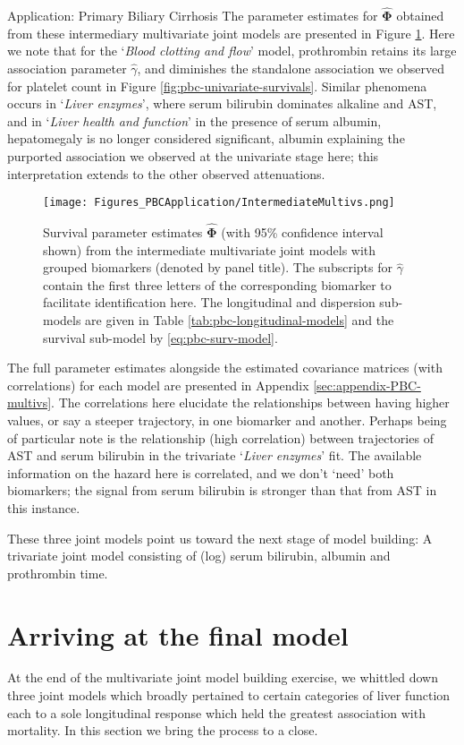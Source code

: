 \begin{chapter}{\label{cha:app-PBC}Application: Primary Biliary Cirrhosis}
  The parameter estimates for $\hat{\bm{\Phi}}$ obtained from these intermediary multivariate joint models are presented in Figure \ref{fig:pbc-multivariate-intermediate}. Here we note that for the `\textit{Blood clotting and flow}' model, prothrombin retains its large association parameter $\hat{\gamma}$, and diminishes the standalone association we observed for platelet count in Figure \ref{fig:pbc-univariate-survivals}. Similar phenomena occurs in `\textit{Liver enzymes}', where serum bilirubin dominates alkaline and AST, and in `\textit{Liver health and function}' in the presence of serum albumin, hepatomegaly is no longer considered significant, albumin explaining the purported association we observed at the univariate stage here; this interpretation extends to the other observed attenuations.

  \begin{figure}[ht]
      \centering
      \texttt{[image: Figures\_PBCApplication/IntermediateMultivs.png]}
      \caption{Survival parameter estimates $\hat{\bm{\Phi}}$ (with 95\% confidence interval shown) from the intermediate multivariate joint models with grouped biomarkers (denoted by panel title). The subscripts for $\hat{\gamma}$ contain the first three letters of the corresponding biomarker to facilitate identification here. The longitudinal and dispersion sub-models are given in Table \ref{tab:pbc-longitudinal-models} and the survival sub-model by \eqref{eq:pbc-surv-model}.}
      \label{fig:pbc-multivariate-intermediate}
  \end{figure}

  The full parameter estimates alongside the estimated covariance matrices (with correlations) for each model are presented in Appendix \ref{sec:appendix-PBC-multivs}. The correlations here elucidate the relationships between \eg having higher values, or say a steeper trajectory, in one biomarker and another. Perhaps being of particular note is the relationship (\ie high correlation) between trajectories of AST and serum bilirubin in the trivariate `\textit{Liver enzymes}' fit. The available information on the hazard here is correlated, and we don't `need' both biomarkers; the signal from serum bilirubin is stronger than that from AST in this instance.

  These three joint models point us toward the next stage of model building: A trivariate joint model consisting of (log) serum bilirubin, albumin and prothrombin time.
    
  \resettocmain
  \section{Arriving at the final model}\label{sec:pbc-finalmodel}
  At the end of the multivariate joint model building exercise, we whittled down three joint models which broadly pertained to certain categories of liver function each to a sole longitudinal response which held the greatest association with mortality. In this section we bring the process to a close.


\end{chapter}
